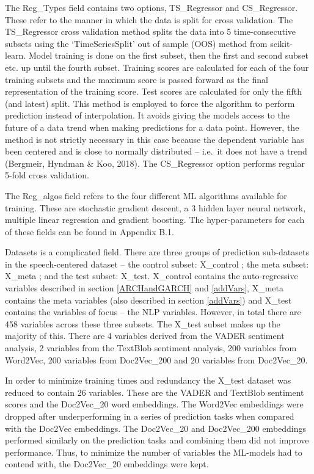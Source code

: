 \documentclass[11pt,preprint, authoryear]{elsarticle}
\numberwithin{equation}{section}
\numberwithin{figure}{section}
\numberwithin{table}{section}
\begin{document}
The Reg\_Types field contains two options, TS\_Regressor and
CS\_Regressor. These refer to the manner in which the data is split for
cross validation. The TS\_Regressor cross validation method splits the
data into 5 time-consecutive subsets using the `TimeSeriesSplit' out of
sample (OOS) method from scikit-learn. Model training is done on the
first subset, then the first and second subset etc. up until the fourth
subset. Training scores are calculated for each of the four training
subsets and the maximum score is passed forward as the final
representation of the training score. Test scores are calculated for
only the fifth (and latest) split. This method is employed to force the
algorithm to perform prediction instead of interpolation. It avoids
giving the models access to the future of a data trend when making
predictions for a data point. However, the method is not strictly
necessary in this case because the dependent variable has been centered
and is close to normally distributed -- i.e.~it does not have a trend
(Bergmeir, Hyndman \& Koo, 2018). The CS\_Regressor option performs
regular 5-fold cross validation.

The Reg\_algos field refers to the four different ML algorithms
available for training. These are stochastic gradient descent, a 3
hidden layer neural network, multiple linear regression and gradient
boosting. The hyper-parameters for each of these fields can be found in
Appendix B.1.

Datasets is a complicated field. There are three groups of prediction
sub-datasets in the speech-centered dataset -- the control subset:
X\_control ; the meta subset: X\_meta ; and the test subset: X\_test.
X\_control contains the auto-regressive variables described in section
\ref{ARCHandGARCH} and \ref{addVars}, X\_meta contains the meta
variables (also described in section \ref{addVars}) and X\_test contains
the variables of focus -- the NLP variables. However, in total there are
458 variables across these three subsets. The X\_test subset makes up
the majority of this. There are 4 variables derived from the VADER
sentiment analysis, 2 variables from the TextBlob sentiment analysis,
200 variables from Word2Vec, 200 variables from Doc2Vec\_200 and 20
variables from Doc2Vec\_20.

In order to minimize training times and redundancy the X\_test dataset
was reduced to contain 26 variables. These are the VADER and TextBlob
sentiment scores and the Doc2Vec\_20 word embeddings. The Word2Vec
embeddings were dropped after underperforming in a series of prediction
tasks when compared with the Doc2Vec embeddings. The Doc2Vec\_20 and
Doc2Vec\_200 embeddings performed similarly on the prediction tasks and
combining them did not improve performance. Thus, to minimize the number
of variables the ML-models had to contend with, the Doc2Vec\_20
embeddings were kept.
\end{document}
